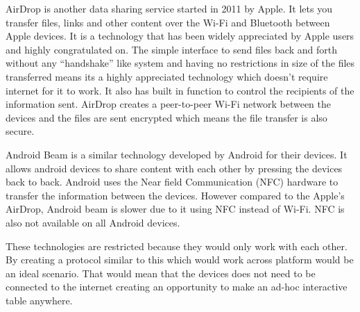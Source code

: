 AirDrop\cite{airdrop} is another data sharing service started in
2011 by Apple. It lets you transfer files, links and other content
over the Wi-Fi and Bluetooth between Apple devices. It is a technology
that has been widely appreciated by Apple users and highly congratulated
on. The simple interface to send files back and forth without any
``handshake'' like system and having no restrictions in size of
the files transferred means its a highly appreciated technology which
doesn't require internet for it to work. It also has built in function
to control the recipients of the information sent. AirDrop creates
a peer-to-peer Wi-Fi network between the devices and the files are
sent encrypted which means the file transfer is also secure.

Android Beam\cite{android-beam} is a similar technology developed
by Android for their devices. It allows android devices to share content
with each other by pressing the devices back to back. Android uses
the Near field Communication (NFC) hardware to transfer the information
between the devices. However compared to the Apple's AirDrop, Android
beam is slower due to it using NFC instead of Wi-Fi. NFC is also not
available on all Android devices.

These technologies are restricted because they would only work with
each other. By creating a protocol similar to this which would work
across platform would be an ideal scenario. That would mean that the
devices does not need to be connected to the internet creating an
opportunity to make an ad-hoc interactive table anywhere.

